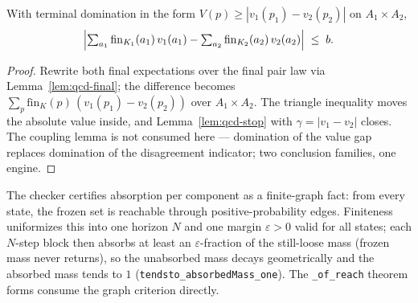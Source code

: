 \begin{bthm}\label{thm:qcd-gap}
With terminal domination in the form
$V(p) \geq |v_1(p_1) - v_2(p_2)|$ on $A_1 \times A_2$,
\[
\Bigl| \textstyle\sum_{a_1} \mathrm{fin}_{K_1}(a_1)\, v_1(a_1)
- \sum_{a_2} \mathrm{fin}_{K_2}(a_2)\, v_2(a_2) \Bigr| \;\leq\; b .
\]
\end{bthm}
\begin{proof}
Rewrite both final expectations over the final pair law via
Lemma~\ref{lem:qcd-final}; the difference becomes
$\sum_p \mathrm{fin}_K(p)\,(v_1(p_1) - v_2(p_2))$ over
$A_1 \times A_2$. The triangle inequality moves the absolute value
inside, and Lemma~\ref{lem:qcd-stop} with
$\gamma = |v_1 - v_2|$ closes. The coupling lemma is not consumed here
--- domination of the value gap replaces domination of the disagreement
indicator; two conclusion families, one engine.
\end{proof}

\begin{bremark}
\label{rem:qcd-reach}
The checker certifies absorption per component as a finite-graph fact:
from every state, the frozen set is reachable through
positive-probability edges. Finiteness uniformizes this into one
horizon $N$ and one margin $\varepsilon > 0$ valid for all states; each
$N$-step block then absorbs at least an $\varepsilon$-fraction of the
still-loose mass (frozen mass never returns), so the unabsorbed mass
decays geometrically and the absorbed mass tends to $1$
(\texttt{tendsto\_absorbedMass\_one}). The \texttt{\_of\_reach}
theorem forms consume the graph criterion directly.
\end{bremark}

